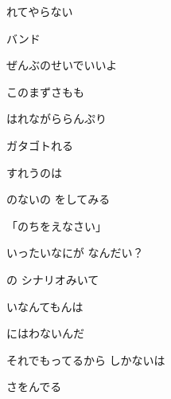 \documentclass[a4paper,tate,twocolumn,12pt]{ltjtarticle}
\begin{document}
\thispagestyle{empty}

\begin{center}
{\LARGE {}れてやらない}

{\large {}バンド}
\end{center}

\vspace{1em}

\begin{flushleft}

\noindent\begin{minipage}{\linewidth}
ぜんぶのせいでいいよ

このまずさもも

はれながららんぷり
\end{minipage}

\vspace{2em}

\noindent\begin{minipage}{\linewidth}
ガタゴトれる

すれうのは

のないの をしてみる
\end{minipage}

\vspace{2em}

\noindent\begin{minipage}{\linewidth}
「のちをえなさい」

いったいなにが なんだい？

の シナリオみいて
\end{minipage}

\vspace{2em}

\noindent\begin{minipage}{\linewidth}
いなんてもんは

にはわないんだ

それでもってるから しかないは

さをんでる


\end{minipage}
\end{flushleft}
\end{document}
